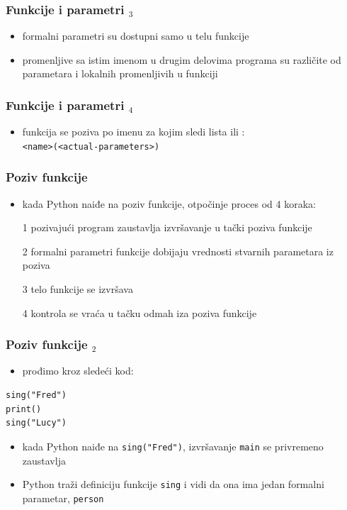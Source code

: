 \documentclass[compress]{beamer}
\begin{document}
\begin{frame}[fragile]
  \frametitle{Funkcije i parametri $_3$}
  \begin{itemize}
    \item formalni parametri su dostupni samo u telu funkcije
    \item promenljive sa istim imenom u drugim delovima programa su različite od parametara i lokalnih promenljivih u funkciji
  \end{itemize}
\end{frame}

\begin{frame}[fragile]
  \frametitle{Funkcije i parametri $_4$}
  \begin{itemize}
    \item funkcija se poziva po imenu za kojim sledi lista  ili : \\
      \texttt{<name>(<actual-parameters>)}
  \end{itemize}
\end{frame}

\begin{frame}[fragile]
  \frametitle{Poziv funkcije}
  \begin{itemize}
    \item kada Python naiđe na poziv funkcije, otpočinje proces od 4 koraka:
    \item[1] pozivajući program zaustavlja izvršavanje u tački poziva funkcije
    \item[2] formalni parametri funkcije dobijaju vrednosti stvarnih parametara iz poziva
    \item[3] telo funkcije se izvršava
    \item[4] kontrola se vraća u tačku odmah iza poziva funkcije
  \end{itemize}
\end{frame}

\begin{frame}[fragile]
  \frametitle{Poziv funkcije $_2$}
  \begin{itemize}
    \item prođimo kroz sledeći kod:
  \end{itemize}
\begin{verbatim}
sing("Fred")
print()
sing("Lucy")
\end{verbatim}
  \begin{itemize}
    \item kada Python naiđe na \texttt{sing("Fred")}, izvršavanje \texttt{main} se privremeno zaustavlja
    \item Python traži definiciju funkcije \texttt{sing} i vidi da ona ima jedan formalni parametar, \texttt{person}
  \end{itemize}
\end{frame}
\end{document}
